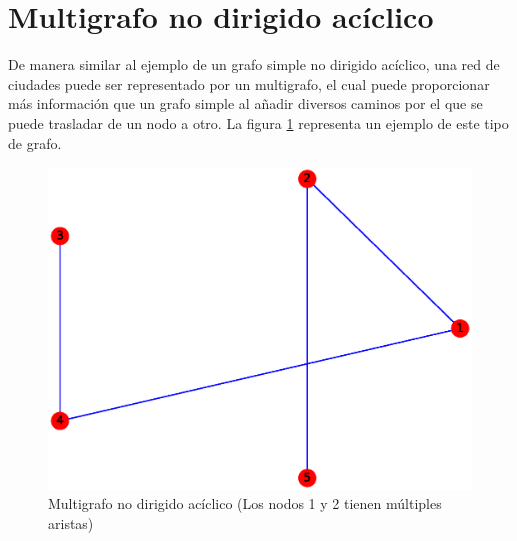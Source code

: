 \documentclass{article}
\begin{document}
\section{Multigrafo no dirigido acíclico}
De manera similar al ejemplo de un grafo simple no dirigido acíclico, una red de ciudades puede ser representado por un multigrafo, el cual puede proporcionar más información que un grafo simple al añadir diversos caminos por el que se puede trasladar de un nodo a otro. La figura \ref{fig:MNDA} representa un ejemplo de este tipo de grafo.
\begin{figure}[h!]
    \includegraphics[width=\textwidth]{7-MNDA}
    \caption{Multigrafo no dirigido acíclico (Los nodos 1 y 2 tienen múltiples aristas)}
    \label{fig:MNDA}
\end{figure}



\end{document}
